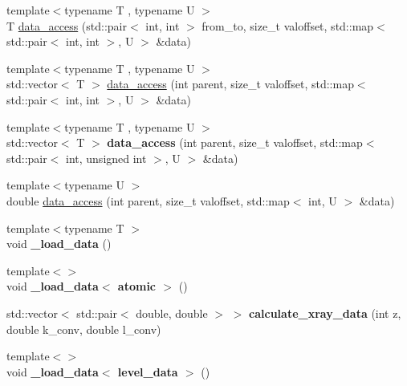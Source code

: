 \begin{DoxyCompactItemize}
\item 
{\footnotesize template$<$typename T , typename U $>$ }\\T \hyperlink{namespacepyne_aa1373c97baba4a611ac69e8f672ff9c6}{data\+\_\+access} (std\+::pair$<$ int, int $>$ from\+\_\+to, size\+\_\+t valoffset, std\+::map$<$ std\+::pair$<$ int, int $>$, U $>$ \&data)
\item 
{\footnotesize template$<$typename T , typename U $>$ }\\std\+::vector$<$ T $>$ \hyperlink{namespacepyne_a2eb8fd6ee7ec49c66d8f1c7b313b0a8a}{data\+\_\+access} (int parent, size\+\_\+t valoffset, std\+::map$<$ std\+::pair$<$ int, int $>$, U $>$ \&data)
\item 
\mbox{\label{namespacepyne_aa1a2be6f328cf28e8f320249534a0577}} 
{\footnotesize template$<$typename T , typename U $>$ }\\std\+::vector$<$ T $>$ {\bfseries data\+\_\+access} (int parent, size\+\_\+t valoffset, std\+::map$<$ std\+::pair$<$ int, unsigned int $>$, U $>$ \&data)
\item 
{\footnotesize template$<$typename U $>$ }\\double \hyperlink{namespacepyne_ab7cc1f6ac1c7ec2c4921fefacc5f0868}{data\+\_\+access} (int parent, size\+\_\+t valoffset, std\+::map$<$ int, U $>$ \&data)
\item 
\mbox{\label{namespacepyne_a730e33590dd1c1df41027d7ca952fb6a}} 
{\footnotesize template$<$typename T $>$ }\\void {\bfseries \+\_\+load\+\_\+data} ()
\item 
\mbox{\label{namespacepyne_a23231dd4e875d332e36d5cdc5cce1341}} 
{\footnotesize template$<$$>$ }\\void {\bfseries \+\_\+load\+\_\+data$<$ atomic $>$} ()
\item 
\mbox{\label{namespacepyne_afc348e3a1127277ad3deacb309faddf1}} 
std\+::vector$<$ std\+::pair$<$ double, double $>$ $>$ {\bfseries calculate\+\_\+xray\+\_\+data} (int z, double k\+\_\+conv, double l\+\_\+conv)
\item 
\mbox{\label{namespacepyne_ad12885416300033e2563dfe87e764f7c}} 
{\footnotesize template$<$$>$ }\\void {\bfseries \+\_\+load\+\_\+data$<$ level\+\_\+data $>$} ()

\end{DoxyCompactItemize}
